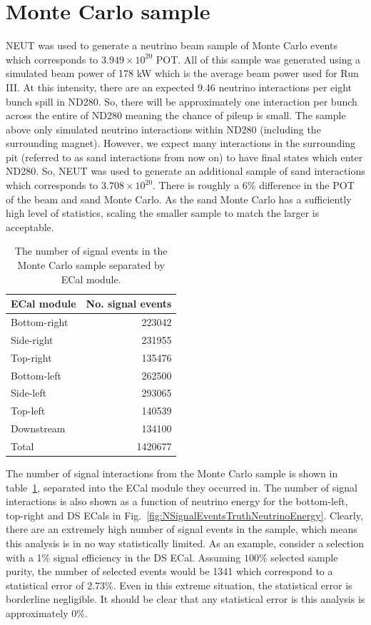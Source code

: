 \section{Monte Carlo sample}
\label{sec:MonteCarloSample}
NEUT was used to generate a neutrino beam sample of Monte Carlo events which corresponds to $3.949\times10^{20}$ POT.  All of this sample was generated using a simulated beam power of 178 kW which is the average beam power used for Run III.  At this intensity, there are an expected 9.46 neutrino interactions per eight bunch spill in ND280.  So, there will be approximately one interaction per bunch across the entire of ND280 meaning the chance of pileup is small. 
\newline
\newline
The sample above only simulated neutrino interactions within ND280 (including the surrounding magnet).  However, we expect many interactions in the surrounding pit (referred to as sand interactions from now on) to have final states which enter ND280.  So, NEUT was used to generate an additional sample of sand interactions which corresponds to $3.708\times10^{20}$.  There is roughly a 6$\%$ difference in the POT of the beam and sand Monte Carlo.  As the sand Monte Carlo has a sufficiently high level of statistics, scaling the smaller sample to match the larger is acceptable.
\newline
\newline
\begin{table}
  \begin{tabular}{ l r }
    ECal module & No. signal events \\ \hline \hline
    Bottom-right & 223042 \\
    Side-right & 231955 \\
    Top-right & 135476 \\
    Bottom-left & 262500 \\
    Side-left & 293065 \\
    Top-left & 140539 \\
    Downstream & 134100 \\
    \hline
    Total & 1420677 \\
  \end{tabular}
  \caption{The number of signal events in the Monte Carlo sample separated by ECal module.}
  \label{table:NSignalEventsTruth}
\end{table}
The number of signal interactions from the Monte Carlo sample is shown in table~\ref{table:NSignalEventsTruth}, separated into the ECal module they occurred in.  The number of signal interactions is also shown as a function of neutrino energy for the bottom-left, top-right and DS ECals in Fig.~\ref{fig:NSignalEventsTruthNeutrinoEnergy}.  Clearly, there are an extremely high number of signal events in the sample, which means this analysis is in no way statistically limited.  As an example, consider a selection with a 1$\%$ signal efficiency in the DS ECal.  Assuming $100\%$ selected sample purity, the number of selected events would be 1341 which correspond to a statistical error of 2.73$\%$.  Even in this extreme situation, the statistical error is borderline negligible.  It should be clear that any statistical error is this analysis is approximately $0\%$.
